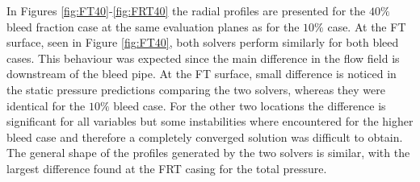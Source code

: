 In Figures \ref{fig:FT40}-\ref{fig:FRT40} the radial profiles are presented for the $40\%$ bleed fraction case at the same evaluation planes as for the $10\%$ case. At the FT surface, seen in Figure \ref{fig:FT40}, both solvers perform similarly for both bleed cases. This behaviour was expected since the main difference in the flow field is downstream of the bleed pipe. At the FT surface, small difference is noticed in the static pressure predictions comparing the two solvers, whereas they were identical for the $10\%$ bleed case. For the other two locations the difference is significant for all variables but some instabilities where encountered for the higher bleed case and therefore a completely converged solution was difficult to obtain. The general shape of the profiles generated by the two solvers is similar, with the largest difference found at the FRT casing for the total pressure.
